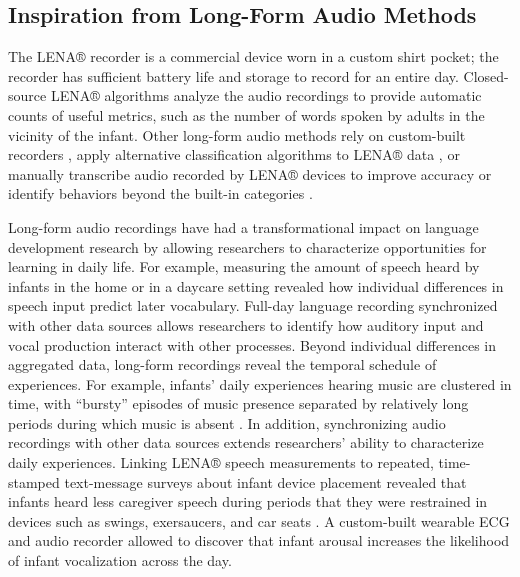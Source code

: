 \documentclass[
  man]{apa6}
\begin{document}
\hypertarget{inspiration-from-long-form-audio-methods}{%
\subsection{Inspiration from Long-Form Audio Methods}\label{inspiration-from-long-form-audio-methods}}

The LENA® recorder is a commercial device worn in a custom shirt pocket; the recorder has sufficient battery life and storage to record for an entire day. Closed-source LENA® algorithms analyze the audio recordings to provide automatic counts of useful metrics, such as the number of words spoken by adults in the vicinity of the infant. Other long-form audio methods rely on custom-built recorders \autocite{WassPhillips2022}, apply alternative classification algorithms to LENA® data \autocite{RasanenSeshadri2020,MichelettiYao2022}, or manually transcribe audio recorded by LENA® devices to improve accuracy or identify behaviors beyond the built-in categories \autocite{Bergelson2019Corpus,MendozaFausey2021}.

Long-form audio recordings have had a transformational impact on language development research by allowing researchers to characterize opportunities for learning in daily life. For example, measuring the amount of speech heard by infants in the home \autocite{Weisleder2013} or in a daycare setting \autocite{PerryPrince2018} revealed how individual differences in speech input predict later vocabulary. Full-day language recording synchronized with other data sources allows researchers to identify how auditory input and vocal production interact with other processes. Beyond individual differences in aggregated data, long-form recordings reveal the temporal schedule of experiences. For example, infants' daily experiences hearing music are clustered in time, with ``bursty'' episodes of music presence separated by relatively long periods during which music is absent \autocite{MendozaFausey2022}. In addition, synchronizing audio recordings with other data sources extends researchers' ability to characterize daily experiences. Linking LENA® speech measurements to repeated, time-stamped text-message surveys about infant device placement revealed that infants heard less caregiver speech during periods that they were restrained in devices such as swings, exersaucers, and car seats \autocite{MalachowskiSalo2023}. A custom-built wearable ECG and audio recorder allowed \textcite{WassPhillips2022} to discover that infant arousal increases the likelihood of infant vocalization across the day.
\end{document}
